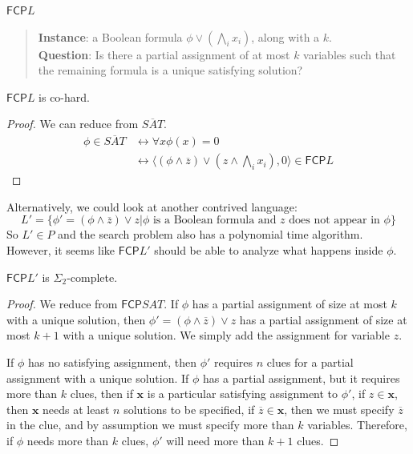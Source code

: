 \documentclass[runningheads,a4paper]{llncs}
\begin{document}
$\mathsf{FCP} L$ 
\begin{quote}
\textbf{Instance}: a Boolean formula $\phi \vee \left( \bigwedge_i x_i\right)$, along with a $k$.\\
\textbf{Question}: Is there a partial assignment of at most $k$ variables such that the remaining formula is a unique satisfying solution?
\end{quote}

\begin{proposition}
$\mathsf{FCP} L$ is co\NP-hard.
\end{proposition}

\begin{proof}
We can reduce from $\overline{SAT}$. 
\begin{align}
\phi \in \overline{SAT} &\leftrightarrow \forall x \phi(x) = 0 \\
				    & \leftrightarrow \langle (\phi \wedge \overline{z}) \vee \left(z \wedge \bigwedge_i x_i \right), 0 \rangle \in \mathsf{FCP} L
\end{align}
\end{proof}

Alternatively, we could look at another contrived language:
\[ L' = \{ \phi' = (\phi \wedge \overline{z}) \vee z | \phi \text{ is a Boolean formula and $z$ does not appear in $\phi$} \} \]
So $L' \in P$ and the search problem also has a polynomial time algorithm. However, it seems like $\mathsf{FCP} L'$ should be able to analyze what happens inside $\phi$. 

\begin{proposition}
$\mathsf{FCP} L'$ is $\Sigma_2$-complete. 
\end{proposition}

\begin{proof}
We reduce from $\mathsf{FCP} SAT$. If $\phi$ has a partial assignment of size at most $k$ with a unique solution, then $\phi' = (\phi \wedge \overline{z}) \vee z$ has a partial assignment of size at most $k+1$ with a unique solution. We simply add the assignment for variable $z$. 

If $\phi$ has no satisfying assignment, then $\phi'$ requires $n$ clues for a partial assignment with a unique solution. If $\phi$ has a partial assignment, but it requires more than $k$ clues, then if $\textbf{x}$ is a particular satisfying assignment to $\phi'$, if $z  \in \textbf{x}$, then $\textbf{x}$ needs at least $n$ solutions to be specified, if $\overline{z} \in \textbf{x}$, then we must specify $\overline{z}$ in the clue, and by assumption we must specify more than $k$ variables. Therefore, if $\phi$ needs more than $k$ clues, $\phi'$ will need more than $k+1$ clues. 
\end{proof}
\end{document}
